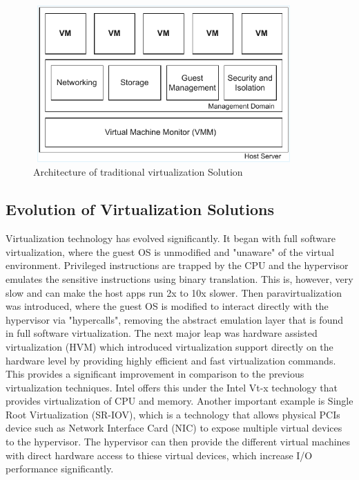 \begin{figure}[H]
  \centering
  \includegraphics[width=10cm, height=6cm]{figures/traditional_hypervisor.pdf}
  \caption{Architecture of traditional virtualization Solution}
  \label{fig:hyper}
\end{figure}

\subsection{Evolution of Virtualization Solutions}
Virtualization technology has evolved significantly. It began with full software virtualization, where the guest OS is unmodified and "unaware" of the virtual environment. Privileged instructions 
are trapped by the CPU and the hypervisor emulates the sensitive instructions using binary translation. This is, however, very slow and can make the host apps run 2x to 10x slower. Then paravirtualization was introduced, where the guest OS is modified to interact directly with the hypervisor via "hypercalls", removing the abstract emulation layer that is found in full software virtualization. 
The next major leap was hardware assisted virtualization (HVM) which introduced virtualization support directly on the hardware level by providing highly efficient and fast 
virtualization commands. This provides a significant improvement in comparison to the previous virtualization techniques. Intel offers this under the Intel Vt-x technology that provides virtualization of CPU and memory. Another important example is Single Root Virtualization (SR-IOV), which is a technology that allows physical PCIs device such as Network Interface Card (NIC) to expose multiple virtual devices to the hypervisor. The hypervisor can then provide the different virtual machines with direct hardware access to thiese virtual devices, which increase I/O performance significantly. 

